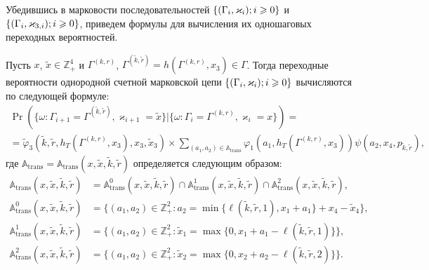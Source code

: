 \documentclass[a4paper,12pt,russian]{extarticle}
\newcommand{\Mark}{\{(\Gamma_i, \varkappa_i); \hm{} i \geqslant 0\}}
\newcommand{\MarkThree}{\{(\Gamma_i, \varkappa_{3,i}); \hm{} i \geqslant 0\}}
\begin{document}
Убедившись в марковости последовательностей $\Mark$ и $\MarkThree$, приведем формулы для вычисления их одношаговых переходных вероятностей. 
\begin{theorem}
Пусть $x$, $\tilde{x}\in \mathbb{Z}_+^4$ и $\Gamma^{(k,r)}$, $\Gamma^{(\tilde{k},\tilde{r})}=h(\Gamma^{(k,r)},x_3) \in \Gamma$. Тогда переходные вероятности однородной счетной марковской цепи $\Mark$ вычисляются по следующей формуле:
\begin{multline}
\Pr (\{\omega\colon \Gamma_{i+1}=\Gamma^{(\tilde{k},\tilde{r})},\varkappa_{i+1}=\tilde{x} \}| \{\omega\colon \Gamma_{i}=\Gamma^{(k,r)},\varkappa_i=x\})=\\ 
=\widetilde{\varphi}_3(\tilde{k},\tilde{r},h_T(\Gamma^{(k,r)},x_3),x_3,\tilde{x}_3)\times
\sum_{(a_1,a_2)\in {\mathbb A}_{\mathrm{trans}}}\varphi_1(a_1,h_T(\Gamma^{(k,r)},x_3))  \psi(a_2,x_4, p_{\tilde{k},\tilde{r}}),
\label{transitionToProve}
\end{multline}
где ${\mathbb A}_{\mathrm{trans}} = {\mathbb A}_{\mathrm{trans}}(x,\tilde{x},\tilde{k},\tilde{r})$ определяется следующим образом:
\begin{align}
{\mathbb A}_{\mathrm{trans}}(x,\tilde{x},\tilde{k},\tilde{r}) &= {\mathbb A}_{\mathrm{trans}}^0(x,\tilde{x},\tilde{k},\tilde{r}) \cap {\mathbb A}_{\mathrm{trans}}^1(x,\tilde{x},\tilde{k},\tilde{r})\cap {\mathbb A}_{\mathrm{trans}}^2(x,\tilde{x},\tilde{k},\tilde{r}),\label{A:trans:1}\\
{\mathbb A}_{\mathrm{trans}}^0(x,\tilde{x},\tilde{k},\tilde{r}) &= \{(a_1,a_2) \in \mathbb{Z}_+^2 \colon a_2 = \min{\{\ell(\tilde{k},\tilde{r},1), x_1+a_1}\} +x_4-\tilde{x}_4\},\\
{\mathbb A}_{\mathrm{trans}}^1(x,\tilde{x},\tilde{k},\tilde{r}) &= \{(a_1,a_2) \in \mathbb{Z}_+^2 \colon \tilde{x}_1=\max{\{0,x_1+a_1-\ell(\tilde{k},\tilde{r},1)\}}\},\\
{\mathbb A}_{\mathrm{trans}}^2(x,\tilde{x},\tilde{k},\tilde{r}) &= \{(a_1,a_2) \in \mathbb{Z}_+^2 \colon  \tilde{x}_2=\max{\{0,x_2+a_2-\ell(\tilde{k},\tilde{r},2)\}}\}.\label{A:trans:2}
\end{align}
\end{theorem}
\end{document}
